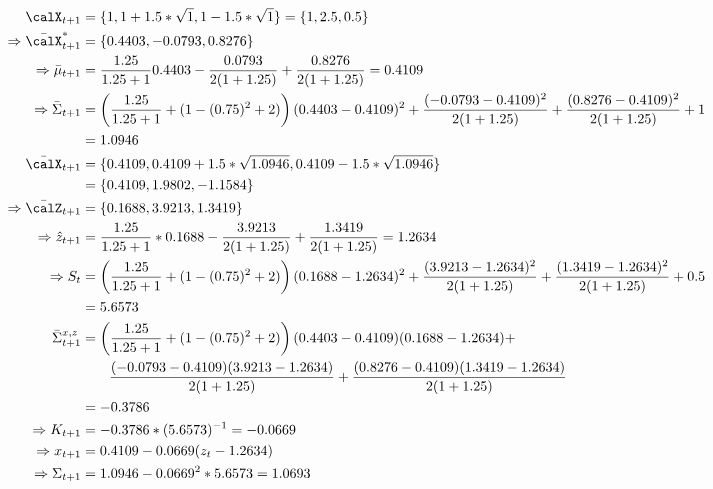 \documentclass{article}
\begin{document}
\begin{enumerate}
\begin{enumerate}
      
      \begin{align*}
       \calX_{t+1} &= \{1, 1 + 1.5*\sqrt{1}, 1-1.5*\sqrt{1}  \} = \{1, 2.5, 0.5\}
       \\
       \Rightarrow \bar \calX_{t+1}^* &=  \{0.4403, -0.0793, 0.8276\}
       \\
       \Rightarrow
       \bar \mu_{t+1} &= \frac{1.25}{1.25+1} 0.4403 - \frac{0.0793}{2(1+1.25)} + \frac{0.8276}{2(1+1.25)} = 0.4109
       \\
       \Rightarrow
       \bar \Sigma_{t+1} &= \left(\frac{1.25}{1.25+1} +(1-(0.75)^2+2) \right)( 0.4403 - 0.4109)^2  + \frac{( -0.0793 - 0.4109)^2}{2(1+1.25)} + \frac{( 0.8276- 0.4109)^2}{2(1+1.25)}+1
       \\
       &= 1.0946
       \\
       \bar \calX_{t+1} &= \{0.4109, 0.4109+1.5*\sqrt{1.0946}, 0.4109-1.5*\sqrt{1.0946}\}
       \\
       &= \{0.4109, 1.9802, -1.1584\}
       \\
       \Rightarrow \bar \calZ_{t+1} &= \{0.1688, 3.9213, 1.3419\}
       \\
       \Rightarrow \hat z_{t+1} &= \frac{1.25}{1.25+1}* 0.1688 - \frac{3.9213}{2(1+1.25)} + \frac{1.3419}{2(1+1.25)} = 1.2634
       \\
       \Rightarrow S_t &=\left(\frac{1.25}{1.25+1} +(1-(0.75)^2+2) \right)( 0.1688 - 1.2634)^2  + \frac{( 3.9213- 1.2634)^2}{2(1+1.25)} + \frac{(1.3419- 1.2634)^2}{2(1+1.25)}+0.5 \\
       &= 5.6573
       \\
       \bar \Sigma_{t+1}^{x,z} &= \left(\frac{1.25}{1.25+1} +(1-(0.75)^2+2) \right)( 0.4403 - 0.4109)( 0.1688 - 1.2634)  +
       \\
       &\qquad\frac{( -0.0793 - 0.4109)( 3.9213- 1.2634)}{2(1+1.25)} + \frac{( 0.8276- 0.4109)(1.3419- 1.2634)}{2(1+1.25)}
       \\
       &= -0.3786
       \\
       \Rightarrow K_{t+1} &= -0.3786*(5.6573)^{-1} = -0.0669
       \\
       \Rightarrow x_{t+1} &= 0.4109-0.0669(z_t - 1.2634)
       \\
       \Rightarrow \Sigma_{t+1} &= 1.0946-0.0669^2*5.6573 = 1.0693
      \end{align*}
      


\end{enumerate}
\end{enumerate}
\end{document}
